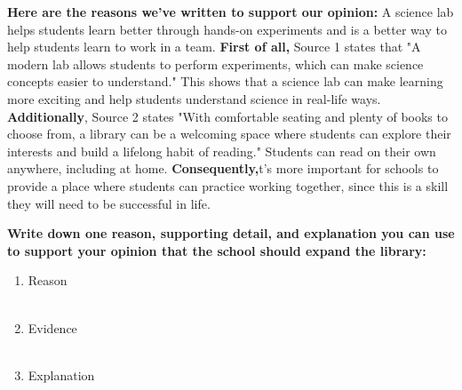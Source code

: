 \documentclass[12pt]{article}
\begin{document}
\begin{tcolorbox}[colframe=black!60, colback=white, 
coltitle=black, colbacktitle=black!15, fonttitle=\bfseries\Large, 
title=Examples, halign title=center, left=10pt, right=10pt, top=10pt, bottom=15pt]
     

\textbf{Here are the reasons we've written to support our opinion:} A science lab helps students learn better through hands-on experiments and is a better way to help students learn to work in a team. \textbf{First of all, }Source 1 states that "A modern lab allows students to perform experiments, which can make science concepts easier to understand." This shows that a science lab can make learning more exciting and help students understand science in real-life ways. \textbf{Additionally}, Source 2 states "With comfortable seating and plenty of books to choose from, a library can be a welcoming space where students can explore their interests and build a lifelong habit of reading." Students can read on their own anywhere, including at home. \textbf{Consequently,}t's more important for schools to provide a place where students can practice working together, since this is a skill they will need to be successful in life.




 


     \end{tcolorbox}
\vspace{1em}



\begin{tcolorbox}[colframe=black!60, colback=white, 
coltitle=black, colbacktitle=black!15, fonttitle=\bfseries\Large, 
title=Guided Practice, halign title=center, left=10pt, right=10pt, top=10pt, bottom=15pt]
\textbf{Write down one reason, supporting detail, and explanation you can use to support your opinion that the school should expand the library:}
\begin{enumerate}[itemsep=3em] %
    \item Reason
    \\[0.8cm] \underline{\hspace{14.3cm}}  
    \\[0.8cm] \underline{\hspace{14.3cm}} 
    \item Evidence
     \\[0.8cm] \underline{\hspace{14.3cm}}  
    \\[0.8cm] \underline{\hspace{14.3cm}} 
    \item Explanation
       \\[0.8cm] \underline{\hspace{14.3cm}}  
    \\[0.8cm] \underline{\hspace{14.3cm}} 

\vspace{1.5em}\end{enumerate}
\end{tcolorbox}
\vspace{2em}
\end{document}
